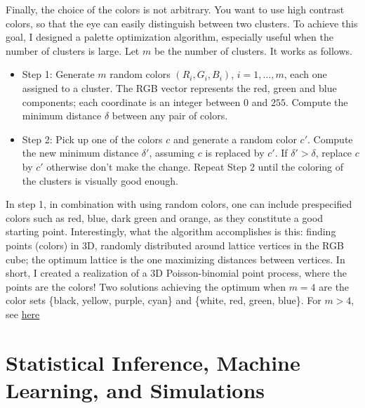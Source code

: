 \documentclass[10pt]{article}
\begin{document}
\noindent Finally, the choice of the colors is not arbitrary. You want to use high contrast colors, so that the eye can easily distinguish between two clusters. To achieve this goal, I designed a 
\textcolor{index}{palette optimization} algorithm, especially useful when the number of clusters is large.  Let $m$ be the number of clusters. It works as follows.

\begin{itemize}
\item Step 1: Generate $m$ random colors $(R_i,G_i,B_i)$, $i=1,\dots,m$, each one assigned to a cluster. The RGB vector represents the red, green and blue components; each coordinate is an integer between $0$ and $255$. Compute the minimum distance $\delta$ between any pair of colors. 
\item Step 2: Pick up one of the colors $c$ and generate a random color $c'$. Compute the new minimum distance $\delta'$, assuming $c$ is replaced by $c'$. If $\delta'>\delta$, replace 
$c$ by $c'$ otherwise don't make the change. Repeat Step 2 until the coloring of the clusters is visually good enough.
\end{itemize}
In step 1, in combination with using random colors, one can include prespecified colors such as red, blue, dark green and orange, as they constitute a good starting point. Interestingly, what the algorithm accomplishes is this: finding points (colors) in 3D, randomly distributed around lattice vertices in the RGB cube; the optimum lattice is the one maximizing distances between 
vertices. In short, I created a realization of a 3D Poisson-binomial point process, where the points are the colors! Two solutions achieving the optimum when $m=4$ are the color sets
 \{black, yellow, purple, cyan\} and \{white, red, green, blue\}. For $m>4$, see \href{https://mathoverflow.net/questions/415618/lattice-like-structure-with-maximum-spacing-between-vertices}{here} 


\section{Statistical Inference, Machine Learning, and Simulations}\label{inference}
\end{document}
